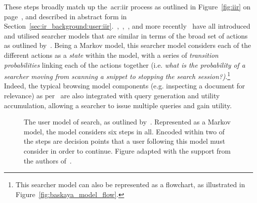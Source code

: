 These steps broadly match up the~\gls{acr:iir} process as outlined in Figure~\ref{fig:iir} on page~\pageref{fig:iir}, and described in abstract form in Section~\ref{sec:ir_background:user:iir}.~\cite{azzopardi2011economics},~\cite{yilmaz2010browsing_utility},~\cite{carterette2011models}, and more recently~\cite{zhang2017simulation_model} have all introduced and utilised searcher models that are similar in terms of the broad set of actions as outlined by~\cite{baskaya2013behavioural_factors}. Being a Markov model, this searcher model considers each of the different actions as a \emph{state} within the model, with a series of \emph{transition probabilities} linking each of the actions together (i.e. \emph{what is the probability of a searcher moving from scanning a snippet to stopping the search session?)}.\footnote{This searcher model can also be represented as a flowchart, as illustrated in Figure~\ref{fig:baskaya_model_flow}.} Indeed, the typical browsing model components (e.g. inspecting a document for relevance) as per~\cite{carterette2011effectiveness_evaluation} are also integrated with query generation and utility accumulation, allowing a searcher to issue multiple queries and gain utility.

\begin{figure}[t!]
    \centering
    \caption[Markov model of the search process by~\cite{baskaya2013behavioural_factors}]{The user model of search, as outlined by~\citealt{baskaya2013behavioural_factors}. Represented as a Markov model, the model considers six steps in all. Encoded within two of the steps are decision points that a user following this model must consider in order to continue. Figure adapted with the support from the authors of~\citealt{baskaya2013behavioural_factors}.}
    \label{fig:baskaya_model}
\end{figure}

